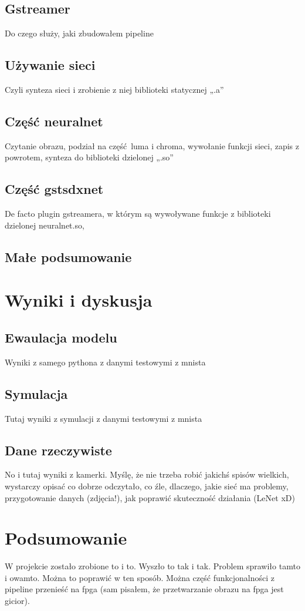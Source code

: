 \documentclass[12pt, oneside]{article}
\begin{document}
\subsection{Gstreamer}
Do czego służy, jaki zbudowałem pipeline

\subsection{Używanie sieci}
Czyli synteza sieci i zrobienie z niej biblioteki statycznej „.a” 

\subsection{Część neuralnet}
Czytanie obrazu, podział na część luma i chroma, wywołanie funkcji sieci,
zapis z powrotem, synteza do biblioteki dzielonej „.so”

\subsection{Część gstsdxnet}
De facto plugin gstreamera, w którym są wywoływane funkcje z biblioteki
dzielonej neuralnet.so, 

\subsection{Małe podsumowanie}


\newpage
\section{Wyniki i dyskusja}

\subsection{Ewaulacja modelu}
Wyniki z samego pythona z danymi testowymi z mnista

\subsection{Symulacja}
Tutaj wyniki z symulacji z danymi testowymi z mnista

\subsection{Dane rzeczywiste}
No i tutaj wyniki z kamerki. Myślę, że nie trzeba robić jakichś spisów wielkich,
wystarczy opisać co dobrze odczytało, co źle, dlaczego, jakie sieć ma problemy,
przygotowanie danych (zdjęcia!), jak poprawić skuteczność działania (LeNet xD)

\newpage
\section{Podsumowanie}
W projekcie zostało zrobione to i to. Wyszło to tak i tak. Problem sprawiło
tamto i owamto. Można to poprawić w ten sposób. Można część funkcjonalności
z pipeline przenieść na fpga (sam pisałem, że przetwarzanie obrazu na fpga
jest gicior).
\end{document}
